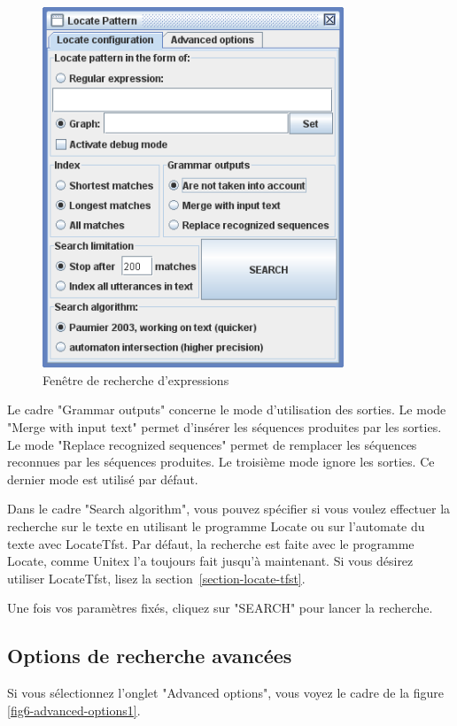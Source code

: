 \bigskip
\begin{figure}[!h]
\begin{center}
\includegraphics[width=9cm]{resources/img/fig6-30.png}
\caption{Fenêtre de recherche d’expressions\label{fig-regexp-frame}}
\end{center}
\end{figure}

\noindent Le cadre "Grammar outputs" concerne le mode d’utilisation des sorties. Le mode "Merge
with input text" permet d’insérer les séquences produites par les sorties. Le mode "Replace
recognized sequences" permet de remplacer les séquences reconnues par les séquences produites.
Le troisième mode ignore les sorties. Ce dernier mode est utilisé par défaut.


\bigskip
\noindent
Dans le cadre "Search algorithm", vous pouvez spécifier si vous voulez effectuer la recherche sur le
texte en utilisant le programme Locate ou sur l'automate du texte avec LocateTfst.
Par défaut, la recherche est faite avec le programme Locate, comme Unitex l'a toujours fait jusqu'à
maintenant. Si vous désirez utiliser LocateTfst, lisez la section~\ref{section-locate-tfst}.

\bigskip
\noindent
Une fois vos paramètres fixés, cliquez sur "SEARCH" pour lancer la recherche.


\subsection{Options de recherche avancées}
\label{section-advanced-search-options}
Si vous sélectionnez l'onglet "Advanced options", vous voyez le cadre de la
figure \ref{fig6-advanced-options1}.

